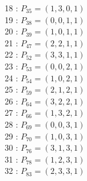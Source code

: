\documentclass{article}
\begin{document}
{\begin{multicols}{3}
18 : $P_{35}=( 1, 3, 0, 1 )$\\
19 : $P_{38}=( 0, 0, 1, 1 )$\\
20 : $P_{39}=( 1, 0, 1, 1 )$\\
21 : $P_{47}=( 2, 2, 1, 1 )$\\
22 : $P_{52}=( 3, 3, 1, 1 )$\\
23 : $P_{53}=( 0, 0, 2, 1 )$\\
24 : $P_{54}=( 1, 0, 2, 1 )$\\
25 : $P_{59}=( 2, 1, 2, 1 )$\\
26 : $P_{64}=( 3, 2, 2, 1 )$\\
27 : $P_{66}=( 1, 3, 2, 1 )$\\
28 : $P_{69}=( 0, 0, 3, 1 )$\\
29 : $P_{70}=( 1, 0, 3, 1 )$\\
30 : $P_{76}=( 3, 1, 3, 1 )$\\
31 : $P_{78}=( 1, 2, 3, 1 )$\\
32 : $P_{83}=( 2, 3, 3, 1 )$\\
\end{multicols}


%


%


}%
\end{document}
